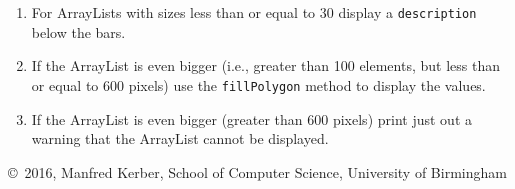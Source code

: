 \documentclass[12pt]{article}
\def\myfooter{\vfill{\footnotesize\noindent\copyright\ 2016, Manfred Kerber, School of Computer Science, University of Birmingham}}
\begin{document}
\begin{enumerate}
\begin{enumerate}
  \item For ArrayLists with sizes less than or equal to 30 display a
    \texttt{description} below the bars.

  \item If the ArrayList is even bigger (i.e., greater than 100
    elements, but less than or equal to 600 pixels) use the
    \texttt{fillPolygon} method to display the values.

  \item If the ArrayList is even bigger (greater than 600 pixels)
    print just out a warning that the ArrayList cannot be displayed.
  \end{enumerate}


\end{enumerate}

\myfooter
\end{document}
